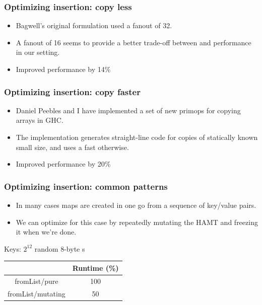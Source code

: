 \documentclass[xetex,mathserif,serif]{beamer}
\newcommand{\code}[1]{\mbox{\texttt{\small{\color{CodeColor}{#1}}}}}
\begin{document}
\begin{frame}
  \frametitle{Optimizing insertion: copy less}

  \begin{itemize}
  \item Bagwell's original formulation used a fanout of 32.
  \item A fanout of 16 seems to provide a better trade-off between
    \code{lookup} and \code{insert} performance in our setting.
  \item Improved performance by 14\%
  \end{itemize}
\end{frame}

\begin{frame}
  \frametitle{Optimizing insertion: copy faster}

  \begin{itemize}
  \item Daniel Peebles and I have implemented a set of new primops for
    copying arrays in GHC.
  \item The implementation generates straight-line code for copies of
    statically known small size, and uses a fast \code{memcpy}
    otherwise.
  \item Improved performance by 20\%
  \end{itemize}
\end{frame}

\begin{frame}
  \frametitle{Optimizing insertion: common patterns}
  \begin{itemize}
  \item In many cases maps are created in one go from a sequence of
    key/value pairs.
  \item We can optimize for this case by repeatedly mutating the HAMT
    and freezing it when we're done.
  \end{itemize}

  \bigskip
  Keys: $2^{12}$ random 8-byte \code{ByteString}s

  \bigskip
  \begin{center}
  \begin{tabular}{c|c}
                         & Runtime (\%) \\
    \hline fromList/pure & 100 \\
           fromList/mutating & 50 \\
  \end{tabular}
  \end{center}
\end{frame}
\end{document}
